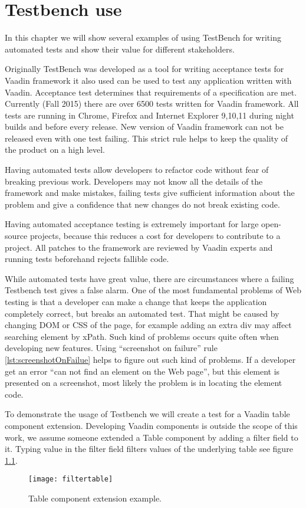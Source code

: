 \chapter{Testbench use}
\label{ch:testbenchuse}
In this chapter we will show several examples of using TestBench for writing
automated tests and show their value for different stakeholders. 

Originally TestBench was developed as a tool for writing acceptance tests for 
Vaadin framework it also used can be used to test any application written with
Vaadin. Acceptance test determines that requirements of a specification are met.
Currently (Fall 2015) there are over 6500 tests written for Vaadin framework.
All tests are running in Chrome, Firefox and Internet Explorer 9,10,11 during
night builds and before every release. New version of Vaadin framework can
not be released even with one test failing. This strict rule helps to keep
the quality of the product on a high level.

Having automated tests allow developers to refactor code without fear of
breaking previous work. Developers may not know all the details of the framework and make mistakes,
 failing tests give sufficient information about the problem 
 and give a confidence that new changes do not break existing code.
   
 Having automated acceptance testing is extremely important for large
 open-source projects, because this reduces a cost for developers to contribute
 to a project.  All patches to the framework are reviewed by Vaadin experts and
 running tests beforehand rejects fallible code.

 While automated tests have great value, there are circumstances
 where a failing Testbench test gives a false alarm. One of the most fundamental
  problems of Web testing is that a developer can make a change that keeps
   the application completely correct, but breaks an automated test.   
That might be caused by changing DOM or CSS of the page, for example adding
an extra div may affect searching element by xPath. Such kind of problems 
occurs quite often when developing new features. Using ``screenshot on failure''
rule \ref{lst:screenshotOnFailue} helps to figure out such kind of problems. If
a developer get an error ``can not find an element on the Web page'', 
but this element is presented on a screenshot, most likely the problem is in
locating the element code.

To demonstrate the usage of Testbench we will create a test for a Vaadin table
component extension. Developing Vaadin components is outside the scope of
this work, we assume someone extended a Table component by adding a filter field to
it. Typing value in the filter field filters values of the underlying table see
figure \ref{fig:filtertable}.
	\begin{figure}
	\centering
	\texttt{[image: filtertable]}
	\caption{Table component extension example.}
	\label{fig:filtertable}
	\end{figure}


